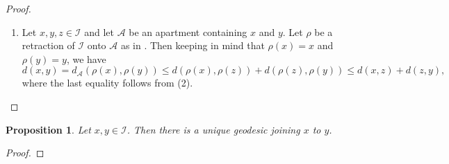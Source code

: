 \documentclass{article}
\theoremstyle{thmstyle}
\newtheorem{proposition}[theorem]{Proposition}
\theoremstyle{defstyle}
\newcommand{\scrA}{\mathscr{A}}
\newcommand{\scrI}{\mathscr{I}}
\renewcommand{\le}{\leqslant}
\begin{document}
\begin{proof}
\begin{enumerate}[label=(\arabic*)]
\item Let $x, y, z\in\scrI$ and let $\scrA$ be an apartment containing $x$ and $y$. Let $\rho$ be a retraction of $\scrI$ onto $\scrA$ as in . Then keeping in mind that $\rho(x) = x$ and $\rho(y) = y$, we have 
\begin{equation*}
    d(x, y) = d_{\scrA}(\rho(x), \rho(y))\le d(\rho(x), \rho(z)) + d(\rho(z), \rho(y))\le d(x, z) + d(z, y),
\end{equation*}
where the last equality follows from (2). \qedhere
\end{enumerate}
\end{proof}

\begin{proposition}
    Let $x, y\in\scrI$. Then there is a unique geodesic joining $x$ to $y$.
\end{proposition}
\begin{proof}
\end{proof}
\end{document}
